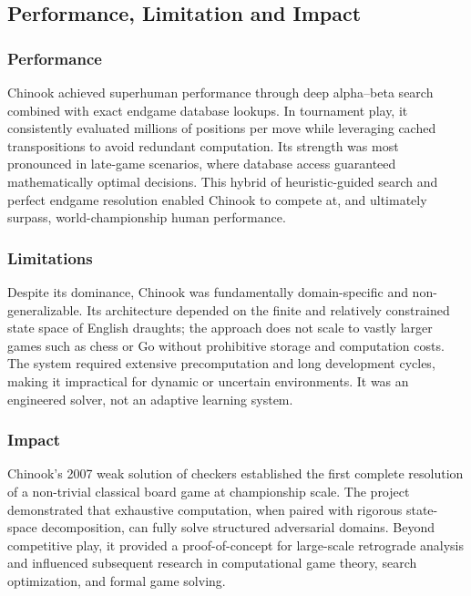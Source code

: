 \documentclass[11pt,a4paper]{report}
\begin{document}
\subsection{Performance, Limitation and Impact}

\subsubsection{Performance}
Chinook achieved superhuman performance through deep alpha–beta search combined with exact endgame database lookups.
In tournament play, it consistently evaluated millions of positions per move while leveraging cached transpositions
to avoid redundant computation. Its strength was most pronounced in late-game scenarios, where database access guaranteed
mathematically optimal decisions. This hybrid of heuristic-guided search and perfect endgame resolution enabled Chinook to
compete at, and ultimately surpass, world-championship human performance.

\subsubsection{Limitations}
Despite its dominance, Chinook was fundamentally domain-specific and non-generalizable. Its architecture depended on
the finite and relatively constrained state space of English draughts; the approach does not scale to vastly larger
games such as chess or Go without prohibitive storage and computation costs. The system required extensive precomputation
and long development cycles, making it impractical for dynamic or uncertain environments. It was an engineered solver,
not an adaptive learning system.

\subsubsection{Impact}
Chinook’s 2007 weak solution of checkers established the first complete resolution of a non-trivial classical board
game at championship scale. The project demonstrated that exhaustive computation, when paired with rigorous
state-space decomposition, can fully solve structured adversarial domains. Beyond competitive play, it provided a
proof-of-concept for large-scale retrograde analysis and influenced subsequent research in computational game
theory, search optimization, and formal game solving.
\end{document}
